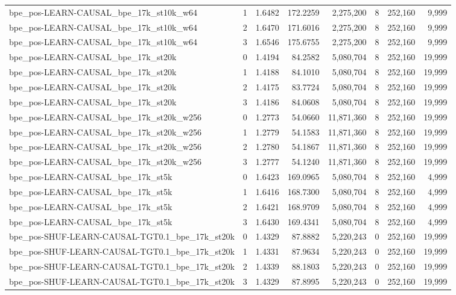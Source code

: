 \begin{tabular}{lrrrrrrr}
bpe\_pos-LEARN-CAUSAL\_bpe\_17k\_st10k\_w64 & 1 & 1.6482 & 172.2259 & 2,275,200 & 8 & 252,160 & 9,999 \\
bpe\_pos-LEARN-CAUSAL\_bpe\_17k\_st10k\_w64 & 2 & 1.6470 & 171.6016 & 2,275,200 & 8 & 252,160 & 9,999 \\
bpe\_pos-LEARN-CAUSAL\_bpe\_17k\_st10k\_w64 & 3 & 1.6546 & 175.6755 & 2,275,200 & 8 & 252,160 & 9,999 \\
bpe\_pos-LEARN-CAUSAL\_bpe\_17k\_st20k & 0 & 1.4194 & 84.2582 & 5,080,704 & 8 & 252,160 & 19,999 \\
bpe\_pos-LEARN-CAUSAL\_bpe\_17k\_st20k & 1 & 1.4188 & 84.1010 & 5,080,704 & 8 & 252,160 & 19,999 \\
bpe\_pos-LEARN-CAUSAL\_bpe\_17k\_st20k & 2 & 1.4175 & 83.7724 & 5,080,704 & 8 & 252,160 & 19,999 \\
bpe\_pos-LEARN-CAUSAL\_bpe\_17k\_st20k & 3 & 1.4186 & 84.0608 & 5,080,704 & 8 & 252,160 & 19,999 \\
bpe\_pos-LEARN-CAUSAL\_bpe\_17k\_st20k\_w256 & 0 & 1.2773 & 54.0660 & 11,871,360 & 8 & 252,160 & 19,999 \\
bpe\_pos-LEARN-CAUSAL\_bpe\_17k\_st20k\_w256 & 1 & 1.2779 & 54.1583 & 11,871,360 & 8 & 252,160 & 19,999 \\
bpe\_pos-LEARN-CAUSAL\_bpe\_17k\_st20k\_w256 & 2 & 1.2780 & 54.1867 & 11,871,360 & 8 & 252,160 & 19,999 \\
bpe\_pos-LEARN-CAUSAL\_bpe\_17k\_st20k\_w256 & 3 & 1.2777 & 54.1240 & 11,871,360 & 8 & 252,160 & 19,999 \\
bpe\_pos-LEARN-CAUSAL\_bpe\_17k\_st5k & 0 & 1.6423 & 169.0965 & 5,080,704 & 8 & 252,160 & 4,999 \\
bpe\_pos-LEARN-CAUSAL\_bpe\_17k\_st5k & 1 & 1.6416 & 168.7300 & 5,080,704 & 8 & 252,160 & 4,999 \\
bpe\_pos-LEARN-CAUSAL\_bpe\_17k\_st5k & 2 & 1.6421 & 168.9709 & 5,080,704 & 8 & 252,160 & 4,999 \\
bpe\_pos-LEARN-CAUSAL\_bpe\_17k\_st5k & 3 & 1.6430 & 169.4341 & 5,080,704 & 8 & 252,160 & 4,999 \\
bpe\_pos-SHUF-LEARN-CAUSAL-TGT0.1\_bpe\_17k\_st20k & 0 & 1.4329 & 87.8882 & 5,220,243 & 0 & 252,160 & 19,999 \\
bpe\_pos-SHUF-LEARN-CAUSAL-TGT0.1\_bpe\_17k\_st20k & 1 & 1.4331 & 87.9634 & 5,220,243 & 0 & 252,160 & 19,999 \\
bpe\_pos-SHUF-LEARN-CAUSAL-TGT0.1\_bpe\_17k\_st20k & 2 & 1.4339 & 88.1803 & 5,220,243 & 0 & 252,160 & 19,999 \\
bpe\_pos-SHUF-LEARN-CAUSAL-TGT0.1\_bpe\_17k\_st20k & 3 & 1.4329 & 87.8995 & 5,220,243 & 0 & 252,160 & 19,999 \\

\end{tabular}
